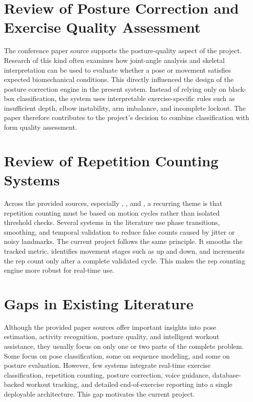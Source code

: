 \documentclass[12pt,a4paper]{report}
\begin{document}
\section{Review of Posture Correction and Exercise Quality Assessment}
The conference paper source \cite{icacc2021_03031} supports the posture-quality aspect of the project. Research of this kind often examines how joint-angle analysis and skeletal interpretation can be used to evaluate whether a pose or movement satisfies expected biomechanical conditions. This directly influenced the design of the posture correction engine in the present system. Instead of relying only on black-box classification, the system uses interpretable exercise-specific rules such as insufficient depth, elbow instability, arm imbalance, and incomplete lockout. The paper therefore contributes to the project's decision to combine classification with form quality assessment.

\section{Review of Repetition Counting Systems}
Across the provided sources, especially \cite{ai_trainer_paper}, \cite{paper_1374}, and \cite{ijsret_1052}, a recurring theme is that repetition counting must be based on motion cycles rather than isolated threshold checks. Several systems in the literature use phase transitions, smoothing, and temporal validation to reduce false counts caused by jitter or noisy landmarks. The current project follows the same principle. It smooths the tracked metric, identifies movement stages such as up and down, and increments the rep count only after a complete validated cycle. This makes the rep counting engine more robust for real-time use.

\section{Gaps in Existing Literature}
Although the provided paper sources offer important insights into pose estimation, activity recognition, posture quality, and intelligent workout assistance, they usually focus on only one or two parts of the complete problem. Some focus on pose classification, some on sequence modeling, and some on posture evaluation. However, few systems integrate real-time exercise classification, repetition counting, posture correction, voice guidance, database-backed workout tracking, and detailed end-of-exercise reporting into a single deployable architecture. This gap motivates the current project.
\end{document}
